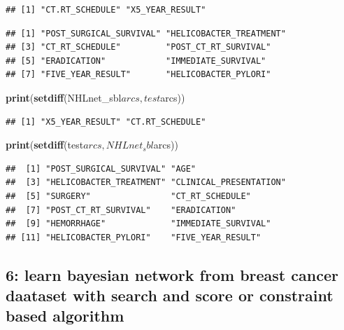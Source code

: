 \documentclass[]{article}
\newenvironment{Shaded}{\begin{snugshade}}{\end{snugshade}}
\newcommand{\KeywordTok}[1]{\textcolor[rgb]{0.13,0.29,0.53}{\textbf{{#1}}}}
\newcommand{\NormalTok}[1]{{#1}}
\begin{document}
\begin{verbatim}
## [1] "CT.RT_SCHEDULE" "X5_YEAR_RESULT"
\end{verbatim}

\begin{Shaded}
\end{Shaded}

\begin{verbatim}
## [1] "POST_SURGICAL_SURVIVAL" "HELICOBACTER_TREATMENT"
## [3] "CT_RT_SCHEDULE"         "POST_CT_RT_SURVIVAL"   
## [5] "ERADICATION"            "IMMEDIATE_SURVIVAL"    
## [7] "FIVE_YEAR_RESULT"       "HELICOBACTER_PYLORI"
\end{verbatim}

\begin{Shaded}
\begin{Highlighting}[]
\KeywordTok{print}\NormalTok{(}\KeywordTok{setdiff}\NormalTok{(NHLnet_sbl$arcs,test$arcs))}
\end{Highlighting}
\end{Shaded}

\begin{verbatim}
## [1] "X5_YEAR_RESULT" "CT.RT_SCHEDULE"
\end{verbatim}

\begin{Shaded}
\begin{Highlighting}[]
\KeywordTok{print}\NormalTok{(}\KeywordTok{setdiff}\NormalTok{(test$arcs,NHLnet_sbl$arcs))}
\end{Highlighting}
\end{Shaded}

\begin{verbatim}
##  [1] "POST_SURGICAL_SURVIVAL" "AGE"                   
##  [3] "HELICOBACTER_TREATMENT" "CLINICAL_PRESENTATION" 
##  [5] "SURGERY"                "CT_RT_SCHEDULE"        
##  [7] "POST_CT_RT_SURVIVAL"    "ERADICATION"           
##  [9] "HEMORRHAGE"             "IMMEDIATE_SURVIVAL"    
## [11] "HELICOBACTER_PYLORI"    "FIVE_YEAR_RESULT"
\end{verbatim}

\subsection{6: learn bayesian network from breast cancer daataset with
search and score or constraint based
algorithm}\label{learn-bayesian-network-from-breast-cancer-daataset-with-search-and-score-or-constraint-based-algorithm}
\end{document}
